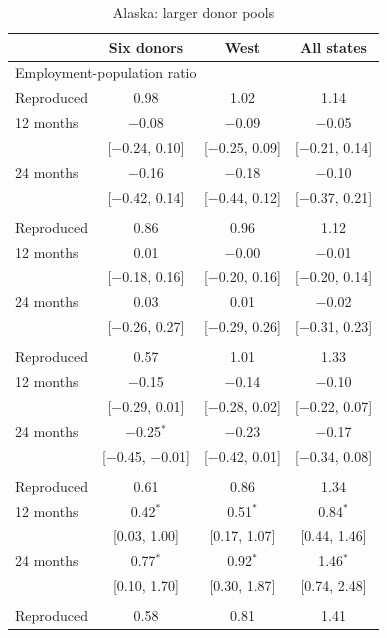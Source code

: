 \begin{table}[htbp]
\centering
\caption{Alaska: larger donor pools\label{tab:ak-pools}}
\footnotesize
\begin{tabular}{lccc}
\toprule
 & Six donors & West & All states \\
\midrule
\multicolumn{4}{l}{Employment-population ratio} \\
Reproduced & 0.98 & 1.02 & 1.14 \\
12 months & $-$0.08 & $-$0.09 & $-$0.05 \\
 & [$-$0.24, 0.10] & [$-$0.25, 0.09] & [$-$0.21, 0.14] \\
24 months & $-$0.16 & $-$0.18 & $-$0.10 \\
 & [$-$0.42, 0.14] & [$-$0.44, 0.12] & [$-$0.37, 0.21] \\
\addlinespace
\multicolumn{4}{l}{Unemployment rate} \\
Reproduced & 0.86 & 0.96 & 1.12 \\
12 months & 0.01 & $-$0.00 & $-$0.01 \\
 & [$-$0.18, 0.16] & [$-$0.20, 0.16] & [$-$0.20, 0.14] \\
24 months & 0.03 & 0.01 & $-$0.02 \\
 & [$-$0.26, 0.27] & [$-$0.29, 0.26] & [$-$0.31, 0.23] \\
\addlinespace
\multicolumn{4}{l}{Participation rate} \\
Reproduced & 0.57 & 1.01 & 1.33 \\
12 months & $-$0.15 & $-$0.14 & $-$0.10 \\
 & [$-$0.29, 0.01] & [$-$0.28, 0.02] & [$-$0.22, 0.07] \\
24 months & $-$0.25$^{*}$ & $-$0.23 & $-$0.17 \\
 & [$-$0.45, $-$0.01] & [$-$0.42, 0.01] & [$-$0.34, 0.08] \\
\addlinespace
\multicolumn{4}{l}{Payroll employment} \\
Reproduced & 0.61 & 0.86 & 1.34 \\
12 months & 0.42$^{*}$ & 0.51$^{*}$ & 0.84$^{*}$ \\
 & [0.03, 1.00] & [0.17, 1.07] & [0.44, 1.46] \\
24 months & 0.77$^{*}$ & 0.92$^{*}$ & 1.46$^{*}$ \\
 & [0.10, 1.70] & [0.30, 1.87] & [0.74, 2.48] \\
\addlinespace
\multicolumn{4}{l}{Leisure and hospitality} \\
Reproduced & 0.58 & 0.81 & 1.41 \\

\end{tabular}
\end{table}
